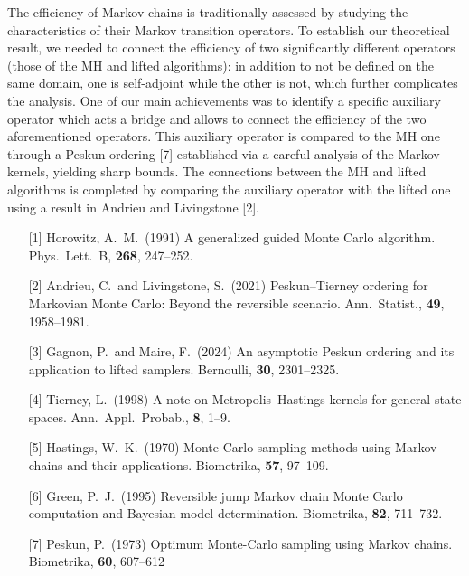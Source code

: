 \begin{talk}
The efficiency of Markov chains is traditionally assessed by studying the characteristics of their Markov transition operators. To establish our theoretical result, we needed to connect the efficiency of two significantly different operators (those of the MH and lifted algorithms): in addition to not be defined on the same domain, one is self-adjoint while the other is not, which further complicates the analysis. One of our main achievements was to identify a specific auxiliary operator which acts a bridge and allows to connect the efficiency of the two aforementioned operators. This auxiliary operator is compared to the MH one through a Peskun ordering [7] established via a careful analysis of the Markov kernels, yielding sharp bounds. The connections between the MH and lifted algorithms is completed by comparing the auxiliary operator with the lifted one using a result in Andrieu and Livingstone [2].

\medskip

\begin{enumerate}
	\item[{[1]}] Horowitz, A.\ M.\ (1991) A generalized guided Monte Carlo algorithm. Phys.\ Lett.\ B, \textbf{268}, 247--252.
	\item[{[2]}] Andrieu, C.\ and Livingstone, S.\ (2021) Peskun--Tierney ordering for Markovian Monte Carlo: Beyond the reversible scenario. Ann.\ Statist., \textbf{49}, 1958--1981.
    \item[{[3]}] Gagnon, P.\ and Maire, F.\ (2024) An asymptotic Peskun ordering and its application to lifted samplers. Bernoulli, \textbf{30}, 2301--2325.
    \item[{[4]}] Tierney, L.\ (1998) A note on Metropolis--Hastings kernels for general state spaces. Ann.\ Appl.\ Probab., \textbf{8}, 1--9.
    \item[{[5]}] Hastings, W.\ K.\ (1970) Monte Carlo sampling methods using Markov chains and their applications. Biometrika, \textbf{57}, 97--109.
    \item[{[6]}] Green, P.\ J.\ (1995) Reversible jump Markov chain Monte Carlo computation and Bayesian model determination. Biometrika, \textbf{82}, 711--732.
    \item[{[7]}] Peskun, P.\ (1973) Optimum Monte-Carlo sampling using Markov chains. Biometrika, \textbf{60}, 607--612
\end{enumerate}


\end{talk}


